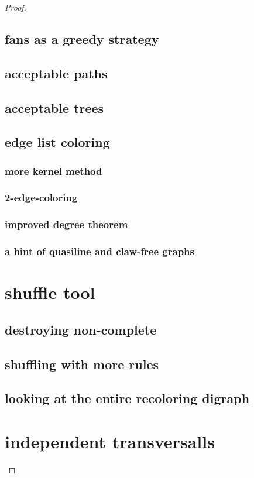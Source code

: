 \documentclass{amsbook}
\theoremstyle{plain}
\numberwithin{equation}{chapter}
\begin{document}
\begin{proof}
\section*{fans as a greedy strategy}
\section*{acceptable paths}
\section*{acceptable trees}
\section*{edge list coloring}
\subsection*{more kernel method}
\subsection*{2-edge-coloring}
\subsection*{improved degree theorem}
\subsection*{a hint of quasiline and claw-free graphs}

\chapter*{shuffle tool}
\section*{destroying non-complete}
\section*{shuffling with more rules}
\section*{looking at the entire recoloring digraph}

\chapter*{independent transversalls}

\end{proof}
\end{document}
